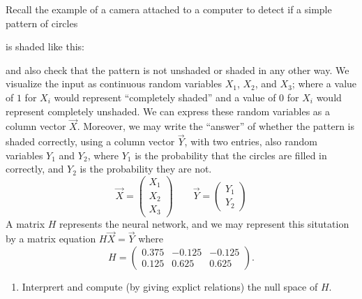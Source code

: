 \documentclass{ximera}
\begin{document}
\begin{example}
  Recall the example of a camera attached to a computer to detect if
  a simple pattern of circles
  \begin{center}
  \end{center}
  is shaded like this:
  \begin{center}
  \end{center}
  and also check that the pattern is not unshaded or shaded in any
  other way. We visualize the input as continuous
  random variables $X_1$, $X_2$, and $X_3$; where a value of $1$ for
  $X_i$ would represent ``completely shaded'' and a value of $0$ for
  $X_i$ would represent completely unshaded. We can express these random
  variables as a column vector $\vec{X}$. Moreover, we may write the
  ``answer'' of whether the pattern is shaded correctly, using a column
  vector $\vec{Y}$, with two entries, also random variables $Y_1$ and
  $Y_2$, where $Y_1$ is the probability that the circles are filled in
  correctly, and $Y_2$ is the probability they are not.
  \[
    \vec{X} = \begin{pmatrix} X_1 \\ X_2 \\ X_3 \end{pmatrix} \qquad \vec{Y} =
    \begin{pmatrix} Y_1 \\ Y_2 \end{pmatrix}
  \]
  A matrix $H$ represents the neural network, and we may represent this
  situtation by a matrix equation $H\vec{X} = \vec{Y}$ where
  \[
  H = \begin{pmatrix}
    0.375 & -0.125 & -0.125 \\
    0.125 & 0.625  & 0.625
  \end{pmatrix}.
  \]
  \begin{enumerate}
    \item Interprert and compute (by giving explict relations) the null space of
          $H$.

\end{enumerate}
\end{example}
\end{document}
